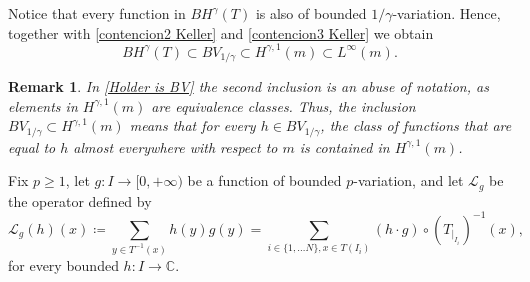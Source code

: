 \documentclass[10pt,a4paper]{amsart}
\numberwithin{equation}{section} %
\numberwithin{figure}{section} %
\newtheorem{rema}[prop]{Remark}
\newcommand{\C}{\mathbb{C}}
\renewcommand{\=}{\coloneqq}
\begin{document}
 Notice that every function in $BH^{\gamma}(T)$ is also of bounded $1/\gamma$-variation. Hence, together with \eqref{contencion2 Keller} and  \eqref{contencion3 Keller} we obtain
\begin{equation}\label{Holder is BV}
    BH^{\gamma}(T)\subset BV_{1/\gamma}\subset H^{\gamma,1}(m)\subset L^{\infty}(m).
\end{equation}
\begin{rema}
    In \eqref{Holder is BV} the second inclusion is an abuse of notation, as elements in $H^{\gamma,1}(m)$ are equivalence classes. Thus, the inclusion $BV_{1/\gamma}\subset H^{\gamma,1}(m)$ means that for every $h \in BV_{1/\gamma}$, the class of functions that are equal to $h$ almost everywhere with respect to $m$ is contained in $H^{\gamma,1}(m)$.
\end{rema}

Fix $p\geq 1$, let $g\colon I\to [0,+\infty)$ be a function of bounded $p$-variation, and let $\mathscr{L}_g$ be the operator defined by
\begin{equation}\label{transfer operator 2}
    \mathscr{L}_g(h)(x)\= \sum_{y\in T^{-1}(x)} h(y)g(y) = \sum_{i\in\{1,\ldots N\}, x\in T(I_i)
    } (h\cdot g)\circ (T_{|_{I_i}})^{-1}(x),
\end{equation}
for every bounded $h:I\to \C$.
\end{document}
